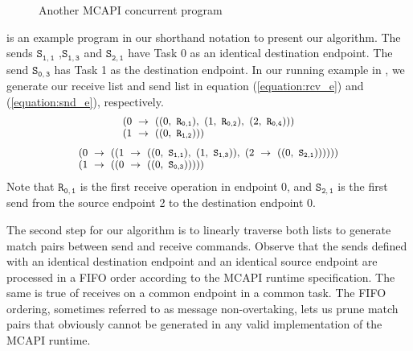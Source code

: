 \begin{figure}
\begin{center}
\begin{tabular}[c]{l|l|l}
\end{tabular}
\end{center}
\caption{Another MCAPI concurrent program}
\label{fig:mcapi1}
\end{figure}

 is an example program in our shorthand notation to present our algorithm. The sends $\mathtt{S_{1,1}}$ ,$\mathtt{S_{1,3}}$ and $\mathtt{S_{2,1}}$ have Task 0 as an identical destination endpoint. The send $\mathtt{S_{0,3}}$ has Task 1 as the destination endpoint. In our running example in , we generate our receive list and send list in equation (\ref{equation:rcv_e}) and (\ref{equation:snd_e}), respectively.
\begin{equation}
\footnotesize \begin{array}{l}
(0\ \rightarrow\ ((0,\ \mathtt{R_{0,1}}),\ (1,\ \mathtt{R_{0,2}}),\ (2,\ \mathtt{R_{0,4}})))\\
(1\ \rightarrow\ ((0,\ \mathtt{R_{1,2}})))\\
\end{array}
\label{equation:rcv_e}
\end{equation}
\begin{equation}
\footnotesize \begin{array}{l}
(0\ \rightarrow\ ((1\ \rightarrow\ ((0,\ \mathtt{S_{1,1}}),\ (1,\ \mathtt{S_{1,3}})),\ (2\ \rightarrow\ ((0,\ \mathtt{S_{2,1}}))))))\\
(1\ \rightarrow\ ((0\ \rightarrow\ ((0,\ \mathtt{S_{0,3}})))))\\
\end{array}
\label{equation:snd_e}
\end{equation}
Note that $\mathtt{R_{0,1}}$ is the first receive operation in endpoint 0, and $\mathtt{S_{2,1}}$ is the first send from the source endpoint 2 to the destination endpoint 0.

The second step for our algorithm is to linearly traverse both lists to generate match pairs between send and receive commands. Observe that the sends defined with an identical destination endpoint and an identical source endpoint are processed in a FIFO order according to the MCAPI runtime specification. The same is true of receives on a common endpoint in a common task. The FIFO ordering, sometimes referred to as message non-overtaking, lets us prune match pairs that obviously cannot be generated in any valid implementation of the MCAPI runtime.

